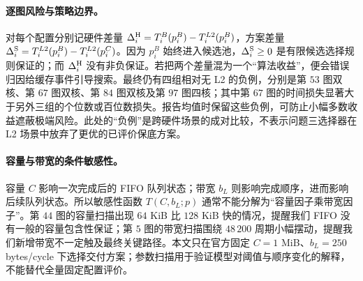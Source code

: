 \paragraph{逐图风险与策略边界。} 对每个配置分别记硬件差量 $\Delta_i^{\rm H}=T^B_i(p^B_i)-T^{L2}_i(p^B_i)$，方案差量 $\Delta_i^{\rm S}=T^{L2}_i(p^B_i)-T^{L2}_i(p^C_i)$。因为 $p^B_i$ 始终进入候选池，$\Delta_i^{\rm S}\ge0$ 是有限候选选择规则保证的；而 $\Delta_i^{\rm H}$ 没有非负保证。若把两个差量混为一个“算法收益”，便会错误归因给缓存事件引导搜索。最终仍有四组相对无 L2 的负例，分别是第 $53$ 图双核、第 $67$ 图双核、第 $84$ 图双核及第 $97$ 图四核；其中第 $67$ 图的时间损失显著大于另外三组的个位数或百位数损失。报告均值时保留这些负例，可防止小幅多数收益遮蔽极端风险。此处的“负例”是跨硬件场景的成对比较，不表示问题三选择器在 L2 场景中放弃了更优的已评价保底方案。

\paragraph{容量与带宽的条件敏感性。} 容量 $C$ 影响一次完成后的 FIFO 队列状态；带宽 $b_L$ 则影响完成顺序，进而影响后续队列状态。所以敏感性函数 $T(C,b_L;p)$ 通常不能分解为“容量因子乘带宽因子”。第 $44$ 图的容量扫描出现 $64$ KiB 比 $128$ KiB 快的情况，提醒我们 FIFO 没有一般的容量包含性保证；第 $5$ 图的带宽扫描围绕 $48\,200$ 周期小幅摆动，提醒我们新增带宽不一定触及最终关键路径。本文只在官方固定 $C=1$ MiB、$b_L=250$ bytes/cycle 下选择交付方案；参数扫描用于验证模型对阈值与顺序变化的解释，不能替代全量固定配置评价。
